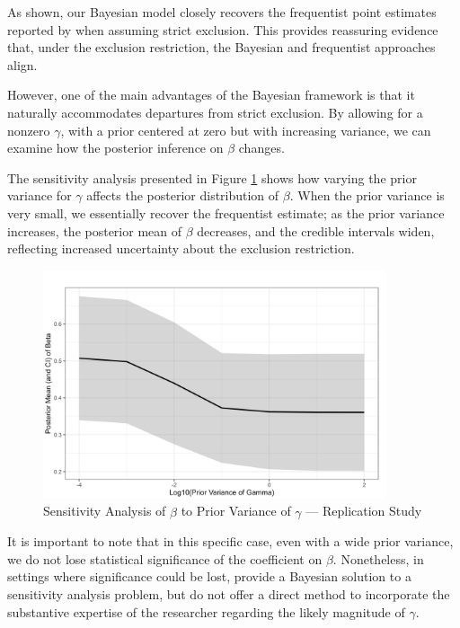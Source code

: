 As shown, our Bayesian model closely recovers the frequentist point estimates reported by \cite{acemogluColonialOriginsComparative2001} when assuming strict exclusion. This provides reassuring evidence that, under the exclusion restriction, the Bayesian and frequentist approaches align.

However, one of the main advantages of the Bayesian framework is that it naturally accommodates departures from strict exclusion. By allowing for a nonzero $\gamma$, with a prior centered at zero but with increasing variance, we can examine how the posterior inference on $\beta$ changes. 

The sensitivity analysis presented in Figure \ref{fig:replication_sensitivity_analysis} shows how varying the prior variance for $\gamma$ affects the posterior distribution of $\beta$. When the prior variance is very small, we essentially recover the frequentist estimate; as the prior variance increases, the posterior mean of $\beta$ decreases, and the credible intervals widen, reflecting increased uncertainty about the exclusion restriction.

\begin{figure}[H]
    \centering
    \includegraphics[width=0.9\textwidth]{../figures/acemoglu/plot_prior_gamma.png}
    \caption{Sensitivity Analysis of $\widehat{\beta}$ to Prior Variance of $\gamma$ --- Replication Study}
    \label{fig:replication_sensitivity_analysis}
    \end{figure}

It is important to note that in this specific case, even with a wide prior variance, we do not lose statistical significance of the coefficient on $\beta$. Nonetheless, in settings where significance could be lost, \cite{conleyPlausiblyExogenous2012} provide a Bayesian solution to a sensitivity analysis problem, but do not offer a direct method to incorporate the substantive expertise of the researcher regarding the likely magnitude of $\gamma$.

